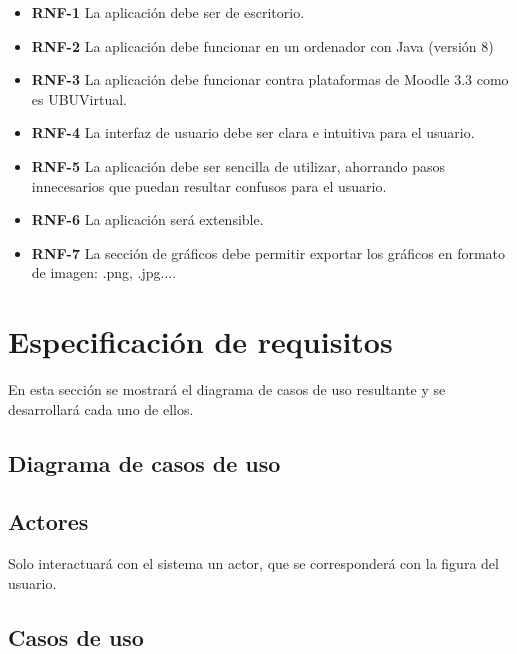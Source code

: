 \begin{itemize}
	\tightlist
	\item
	\textbf{RNF-1} La aplicación debe ser de escritorio.
	\item
	\textbf{RNF-2} La aplicación debe funcionar en un ordenador con Java (versión 8)
	\item
	\textbf{RNF-3} La aplicación debe funcionar contra plataformas de Moodle 3.3 como es UBUVirtual.
	\item
	\textbf{RNF-4} La interfaz de usuario debe ser clara e intuitiva para el usuario.
	\item
	\textbf{RNF-5} La aplicación debe ser sencilla de utilizar, ahorrando pasos innecesarios que puedan resultar confusos para el usuario.
	\item
	\textbf{RNF-6} La aplicación será extensible.
	\item
	\textbf{RNF-7} La sección de gráficos debe permitir exportar los gráficos en formato de imagen: .png, .jpg....

\end{itemize}

\section{Especificación de requisitos}

En esta sección se mostrará el diagrama de casos de uso resultante y se
desarrollará cada uno de ellos.	
\subsection{Diagrama de casos de uso}\label{diagrama-de-casos-de-uso}
	

\subsection{Actores}\label{actores}

Solo interactuará con el sistema un actor, que se corresponderá con la
figura del usuario.

\subsection{Casos de uso}\label{casos-de-uso}

